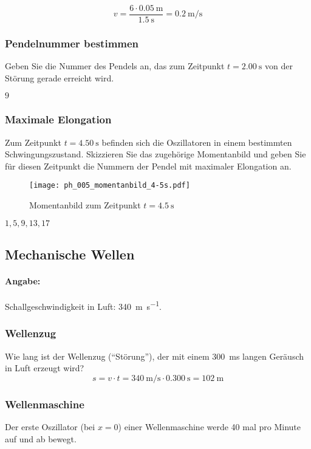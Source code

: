 \documentclass{ajc}
\begin{document}
	\begin{equation}
		v = \frac{6 \cdot \SI{0,05}{\m}}{\SI{1,5}{\s}} = \SI{0,2}{\m\per\s}
	\end{equation}
	
	\subsubsection{Pendelnummer bestimmen}
	Geben Sie die Nummer des Pendels an, das zum Zeitpunkt $t = \SI{2,00}{\second}$ von der Störung gerade erreicht wird.
	
	$9$
	
	\subsubsection{Maximale Elongation}
	Zum Zeitpunkt $t = \SI{4,50}{\second}$ befinden sich die Oszillatoren in einem bestimmten Schwingungszustand. Skizzieren Sie das zugehörige Momentanbild und geben Sie für diesen Zeitpunkt die Nummern der Pendel mit maximaler Elongation an.
	
	\begin{figure}[ht]
		\centering
		\texttt{[image: ph\_005\_momentanbild\_4-5s.pdf]}
		\caption{Momentanbild zum Zeitpunkt $t = \SI{4,5}{\second}$}
		\label{fig:mom_4.5s}
	\end{figure}
	
	$1,5,9,13,17$
	
	\newpage
	
	\subsection{Mechanische Wellen}
	\paragraph{Angabe:} Schallgeschwindigkeit in Luft: \SI{340}{\m\per\s}.
	
	\subsubsection{Wellenzug}
	Wie lang ist der Wellenzug (\enquote{Störung}), der mit einem \SI{300}{\milli\s} langen Geräusch in Luft erzeugt wird?
	\begin{equation}
		s = v \cdot t = \SI{340}{\m\per\s} \cdot \SI{0,300}{\s} = \SI{102}{\m}
	\end{equation}
	
	\subsubsection{Wellenmaschine}
	Der erste Oszillator (bei $x = 0$) einer Wellenmaschine werde 40 mal pro Minute auf und ab bewegt.
	
\end{document}
